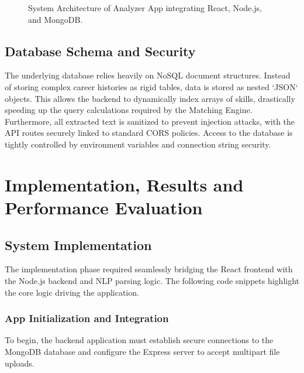 \documentclass[12pt,a4paper]{report}
\begin{document}
\begin{figure}[h]
\centering
\vspace{6cm} 
\caption{System Architecture of Analyzer App integrating React, Node.js, and MongoDB.}
\label{fig:system_architecture}
\end{figure}

\section{Database Schema and Security}
The underlying database relies heavily on NoSQL document structures. Instead of storing complex career histories as rigid tables, data is stored as nested `JSON` objects. This allows the backend to dynamically index arrays of skills, drastically speeding up the query calculations required by the Matching Engine. Furthermore, all extracted text is sanitized to prevent injection attacks, with the API routes securely linked to standard CORS policies. Access to the database is tightly controlled by environment variables and connection string security.

\chapter{Implementation, Results and Performance Evaluation}

\section{System Implementation}

The implementation phase required seamlessly bridging the React frontend with the Node.js backend and NLP parsing logic. The following code snippets highlight the core logic driving the application.

\subsection{App Initialization and Integration}
To begin, the backend application must establish secure connections to the MongoDB database and configure the Express server to accept multipart file uploads.
\end{document}
